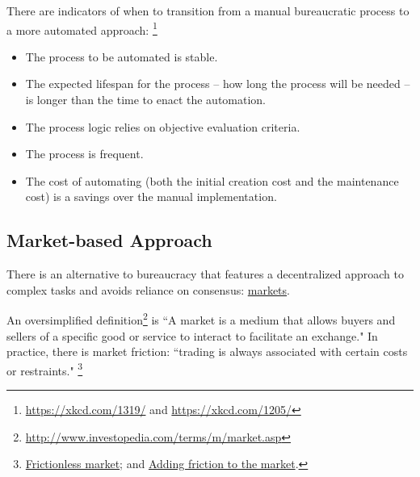 There are indicators of when to transition from a manual bureaucratic process to a more automated approach:
\footnote{\href{https://xkcd.com/1319/}{https://xkcd.com/1319/} and \href{https://xkcd.com/1205/}{https://xkcd.com/1205/}}
\begin{itemize}
    \item The process to be automated is stable.
    \item The expected lifespan for the process -- how long the process will be needed -- is  longer than the time to enact the automation.
\item The process logic relies on objective evaluation criteria.  
\item The process is frequent.
\item The cost of automating (both the initial creation cost and the maintenance cost) is a savings over the manual implementation.
\end{itemize}


\subsection*{Market-based Approach}

There is an alternative to bureaucracy that features a decentralized approach to complex tasks and avoids reliance on consensus: \href{https://en.wikipedia.org/wiki/Market_(economics)}{markets}.

An oversimplified definition\footnote{\href{http://www.investopedia.com/terms/m/market.asp}{http://www.investopedia.com/terms/m/market.asp}} is ``A market is a medium that allows buyers and sellers of a specific good or service to interact to facilitate an exchange." 
In practice, there is market friction: ``trading is always associated with certain costs or restraints."
\footnote{\href{http://www.investopedia.com/terms/f/frictionlessmarket.asp}{Frictionless market};
and \href{https://insight.kellogg.northwestern.edu/article/adding_friction_to_the_market}{Adding friction to the market}.}

